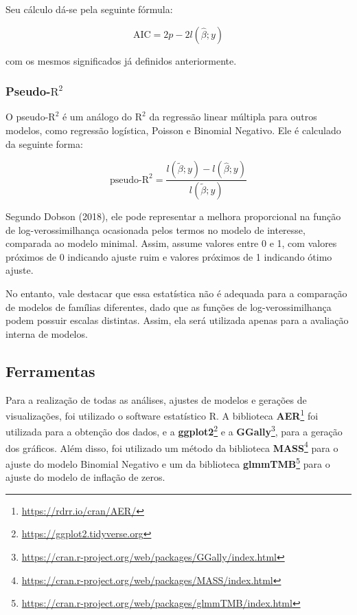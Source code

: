 \documentclass[
  twocolumn]{article}
\begin{document}
Seu cálculo dá-se pela seguinte fórmula:

\[
\text{AIC} = 2p - 2l(\hat{\beta}; y)
\]

com os mesmos significados já definidos anteriormente.

\subsubsection{\texorpdfstring{Pseudo-\(\text{R}^2\)}{Pseudo-\textbackslash text\{R\}\^{}2}}\label{pseudo-textr2}

O pseudo-\(\text{R}^2\) é um análogo do \(\text{R}^2\) da regressão
linear múltipla para outros modelos, como regressão logística, Poisson e
Binomial Negativo. Ele é calculado da seguinte forma:

\[
\text{pseudo-R}^2 = \dfrac{l(\tilde{\beta}; y) - l(\hat{\beta}; y)}{l(\tilde{\beta}; y)}
\]

Segundo Dobson (2018), ele pode representar a melhora proporcional na
função de log-verossimilhança ocasionada pelos termos no modelo de
interesse, comparada ao modelo minimal. Assim, assume valores entre 0 e
1, com valores próximos de 0 indicando ajuste ruim e valores próximos de
1 indicando ótimo ajuste.

No entanto, vale destacar que essa estatística não é adequada para a
comparação de modelos de famílias diferentes, dado que as funções de
log-verossimilhança podem possuir escalas distintas. Assim, ela será
utilizada apenas para a avaliação interna de modelos.

\subsection{Ferramentas}\label{ferramentas}

Para a realização de todas as análises, ajustes de modelos e gerações de
visualizações, foi utilizado o software estatístico R. A biblioteca
\textbf{AER}\footnote{\url{https://rdrr.io/cran/AER/}} foi utilizada
para a obtenção dos dados, e a \textbf{ggplot2}\footnote{\url{https://ggplot2.tidyverse.org}}
e a \textbf{GGally}\footnote{\url{https://cran.r-project.org/web/packages/GGally/index.html}},
para a geração dos gráficos. Além disso, foi utilizado um método da
biblioteca \textbf{MASS}\footnote{\url{https://cran.r-project.org/web/packages/MASS/index.html}}
para o ajuste do modelo Binomial Negativo e um da biblioteca
\textbf{glmmTMB}\footnote{\url{https://cran.r-project.org/web/packages/glmmTMB/index.html}}
para o ajuste do modelo de inflação de zeros.
\end{document}

